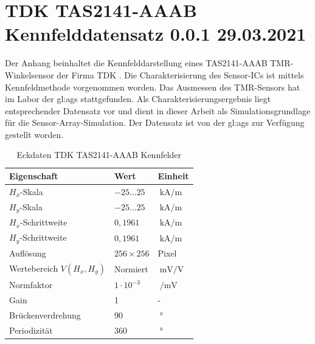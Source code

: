 %

\chapter{TDK TAS2141-AAAB Kennfelddatensatz 0.0.1 29.03.2021}\label{ch:tdk-datensatz}

Der Anhang beinhaltet die Kennfelddarstellung eines TAS2141-AAAB TMR-Winkelsensor der Firma TDK \cite{TDK2016}. Die 
Charakterisierung des Sensor-ICs ist mittels Kennfeldmethode \cite{Schuethe2019} vorgenommen worden. Das Ausmessen des 
TMR-Sensors hat im Labor der \gls{gl:ags} stattgefunden. Als Charakterisierungsergebnis liegt entsprechender Datensatz 
vor und dient in dieser Arbeit als Simulationsgrundlage für die Sensor-Array-Simulation. Der Datensatz ist von der 
\gls{gl:ags} zur Verfügung gestellt worden.


\vspace{5mm}
\begin{table}[!htbp]
	\centering
	\begin{tabular}{l l l}
		\toprule
		\textbf{Eigenschaft}      & \textbf{Wert}    & \textbf{Einheit} \\
		\midrule
		$H_x$-Skala               & $-25 \ldots 25$  & $\SI{}{\kilo\ampere\per\metre}$ \\
		$H_y$-Skala               & $-25 \ldots 25$  & $\SI{}{\kilo\ampere\per\metre}$ \\
		\hline
		$H_x$-Schrittweite        & $0,1961$         & $\SI{}{\kilo\ampere\per\metre}$ \\
		$H_y$-Schrittweite        & $0,1961$         & $\SI{}{\kilo\ampere\per\metre}$ \\
		\hline
		Auflösung                 & $256 \times 256$ & Pixel \\
		Wertebereich $V(H_x,H_y)$ & Normiert         & $\SI{}{\milli\volt\per\volt}$ \\
		\hline
		Normfaktor                & $1\cdot 10^{-3}$ & $\SI{}{\per\milli\volt}$ \\
		Gain                      & 1                & - \\
		\hline
		Brückenverdrehung         & 90               & $\SI{}{\degree}$ \\
		Periodizität              & 360              & $\SI{}{\degree}$ \\
		\bottomrule		
	\end{tabular}%
	\caption[Eckdaten TDK TAS2141-AAAB Kennfelder]{Eckdaten TDK TAS2141-AAAB Kennfelder}
\label{tab:tdk-char-data}
\end{table}


